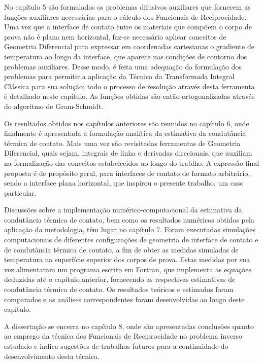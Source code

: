 No capítulo 5 são formulados os problemas difusivos auxiliares que fornecem as funções auxiliares necessárias para o cálculo dos Funcionais de Reciprocidade. Uma vez que a interface de contato entre os materiais que compõem o corpo de prova não é plana nem horizontal, faz-se necessário aplicar conceitos de Geometria Diferencial para expressar em coordenadas cartesianas o gradiente de temperatura ao longo da interface, que aparece nas condições de contorno dos problemas auxiliares. Desse modo, é feita uma adequação da formulação dos problemas para permitir a aplicação da Técnica da Transformada Integral Clássica para sua solução; todo o processo de resolução através desta ferramenta é detalhado neste capítulo. As funções obtidas são então ortogonalizadas através do algoritmo de Gram-Schmidt.

Os resultados obtidos nos capítulos anteriores são reunidos no capítulo 6, onde finalmente é apresentada a formulação analítica da estimativa da condutância térmica de contato. Mais uma vez são revisitadas ferramentas de Geometria Diferencial, quais sejam, integrais de linha e derivadas direcionais, que auxiliam na formalização das conceitos estabelecidos ao longo do trablho. A expressão final proposta é de propósito geral, para interfaces de contato de formato arbitrário, sendo a interface plana horizontal, que inspirou o presente trabalho, um caso particular.

Discussões sobre a implementação numérico-computacional da estimativa da condutância térmica de contato, bem como os resultados numéricos obtidos pela aplicação da metodologia, têm lugar no capítulo 7. Foram executadas simulações computacionais de diferentes configurações de geometria de interface de contato e de condutância térmica de contato, a fim de obter as medidas simuladas de temperatura na superfície superior dos corpos de prova. Estas medidas por sua vez alimentaram um programa escrito em Fortran, que implementa as equações deduzidas até o capítulo anterior, fornecendo as respectivas estimativas de condutância térmica de contato. Os resultados teóricos e estimados foram comparados e as análises correspondentes foram desenvolvidas ao longo deste capítulo.

A dissertação se encerra no capítulo 8, onde são apresentadas conclusões quanto ao emprego da técnica dos Funcionais de Reciprocidade no problema inverso estudado e indica sugestões de trabalhos futuros para a continuidade do desenvolvimento desta técnica.